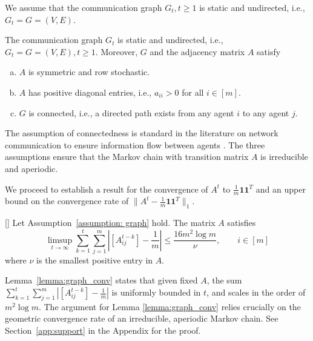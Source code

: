 \documentclass[twoside,11pt]{article}
\numberwithin{equation}{section}
\newcommand{\ones}{\mathbf{1}}
\begin{document}
{We assume that the communication graph $G_t, t \geq 1$ is static and undirected, i.e., $G_t = G = (V, E)$. 
\begin{assumption}\label{assumption: graph}
The communication graph $G_t$ is static and undirected, i.e., $G_t = G = (V, E), t \geq 1$. Moreover, $G$ and the adjacency matrix $A$ satisfy
\begin{enumerate}[(a)]
    \item $A$ is symmetric and row stochastic. 
    \item $A$ has positive diagonal entries, i.e., $a_{ii} > 0$ for all $i \in [m]$. %
    \item $G$ is connected, i.e., a directed path exists from any agent $i$ to any agent $j$. 
\end{enumerate}
\end{assumption}
The assumption of connectedness is standard in the literature on network communication to ensure information flow between agents \citep{Shahrampour2015, Nedic2017}. The three assumptions ensure that the Markov chain with transition matrix $A$ is irreducible and aperiodic. 

We proceed to establish a result for the convergence of $A^t$ to $\frac{1}{m}\ones \ones^T$ and an upper bound on the convergence rate of $\|A^t - \frac{1}{m}\ones \ones^T\|_1$. 
\begin{lemma}
\label{lemma:graph_conv}[\cite{acemoglu2011bayesian,Nedic2017}]
Let Assumption~\ref{assumption: graph} hold. The matrix $A$ satisfies
\begin{equation*}
   \limsup_{t \to \infty} \sum_{k = 1}^t \sum_{j = 1}^m |[A^{t - k}_{ij}] - \frac{1}{m}| \leq \frac{16m^2 \log m}{\nu}, \qquad i \in [m]
\end{equation*}
where $\nu$ is the smallest positive entry in $A$. 
\end{lemma}
 
Lemma~\ref{lemma:graph_conv} states that given fixed $A$, the sum $\sum_{k = 1}^t \sum_{j = 1}^m |[A^{t - k}_{ij}] - \frac{1}{m}|$ is uniformly bounded in $t$, and scales in the order of $m^2 \log m$. The argument for Lemma \ref{lemma:graph_conv} relies crucially on the geometric convergence rate of an irreducible, aperiodic Markov chain.  See Section~\ref{app:support} in the Appendix for the proof.


}
\end{document}
